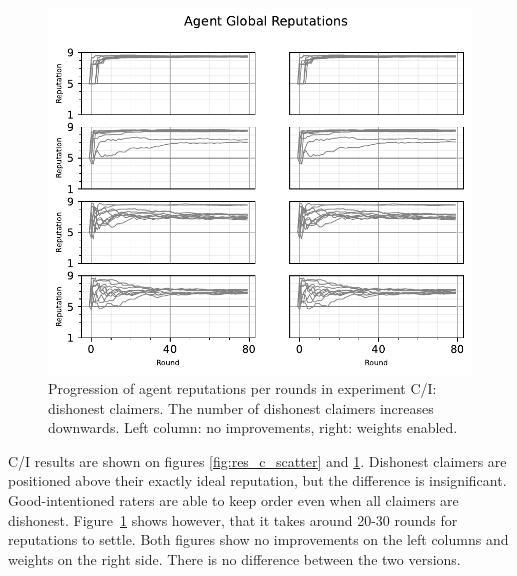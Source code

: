 \documentclass[%
    ]{\PathToTumTemplate/thesis/tum_thesis}
\begin{document}
\begin{figure}[tbp]
  \begin{center}
        \includegraphics[width=0.75\linewidth]	{../results/c/ReputationsPerRounds_joined.pdf}
    \caption{
 	Progression of agent reputations per rounds in experiment C/I: dishonest claimers.
    The number of dishonest claimers increases downwards.
    Left column: no improvements, right: weights enabled.
    }
    \label{fig:res_c_reps}
  \end{center}
\end{figure}

C/I results are shown on figures \ref{fig:res_c_scatter} and \ref{fig:res_c_reps}.
Dishonest claimers are positioned above their exactly ideal reputation, but the difference is insignificant.
Good-intentioned raters are able to keep order even when all claimers are dishonest.
Figure~\ref{fig:res_c_reps} shows however, that it takes around 20-30 rounds for reputations to settle.
Both figures show no improvements on the left columns and weights on the right side.
There is no difference between the two versions.
\end{document}
